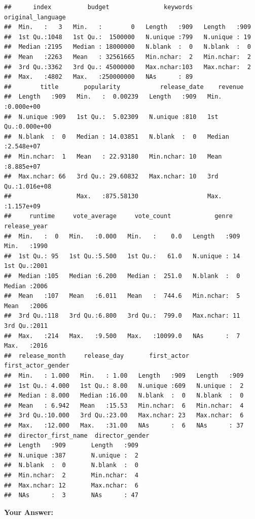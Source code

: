 \documentclass[
]{article}
\begin{document}
\begin{verbatim}
##      index          budget               keywords   original_language
##  Min.   :   3   Min.   :        0   Length   :909   Length   :909    
##  1st Qu.:1048   1st Qu.:  1500000   N.unique :799   N.unique : 19    
##  Median :2195   Median : 18000000   N.blank  :  0   N.blank  :  0    
##  Mean   :2263   Mean   : 32561665   Min.nchar:  2   Min.nchar:  2    
##  3rd Qu.:3362   3rd Qu.: 45000000   Max.nchar:103   Max.nchar:  2    
##  Max.   :4802   Max.   :250000000   NAs      : 89                    
##        title       popularity           release_date    revenue         
##  Length   :909   Min.   :  0.00239   Length   :909   Min.   :0.000e+00  
##  N.unique :909   1st Qu.:  5.02309   N.unique :810   1st Qu.:0.000e+00  
##  N.blank  :  0   Median : 14.03851   N.blank  :  0   Median :2.548e+07  
##  Min.nchar:  1   Mean   : 22.93180   Min.nchar: 10   Mean   :8.885e+07  
##  Max.nchar: 66   3rd Qu.: 29.60832   Max.nchar: 10   3rd Qu.:1.016e+08  
##                  Max.   :875.58130                   Max.   :1.157e+09  
##     runtime     vote_average     vote_count            genre      release_year 
##  Min.   :  0   Min.   :0.000   Min.   :    0.0   Length   :909   Min.   :1990  
##  1st Qu.: 95   1st Qu.:5.500   1st Qu.:   61.0   N.unique : 14   1st Qu.:2001  
##  Median :105   Median :6.200   Median :  251.0   N.blank  :  0   Median :2006  
##  Mean   :107   Mean   :6.011   Mean   :  744.6   Min.nchar:  5   Mean   :2006  
##  3rd Qu.:118   3rd Qu.:6.800   3rd Qu.:  799.0   Max.nchar: 11   3rd Qu.:2011  
##  Max.   :214   Max.   :9.500   Max.   :10099.0   NAs      :  7   Max.   :2016  
##  release_month     release_day       first_actor  first_actor_gender
##  Min.   : 1.000   Min.   : 1.00   Length   :909   Length   :909     
##  1st Qu.: 4.000   1st Qu.: 8.00   N.unique :609   N.unique :  2     
##  Median : 8.000   Median :16.00   N.blank  :  0   N.blank  :  0     
##  Mean   : 6.942   Mean   :15.53   Min.nchar:  6   Min.nchar:  4     
##  3rd Qu.:10.000   3rd Qu.:23.00   Max.nchar: 23   Max.nchar:  6     
##  Max.   :12.000   Max.   :31.00   NAs      :  6   NAs      : 37     
##  director_first_name  director_gender
##  Length   :909       Length   :909   
##  N.unique :387       N.unique :  2   
##  N.blank  :  0       N.blank  :  0   
##  Min.nchar:  2       Min.nchar:  4   
##  Max.nchar: 12       Max.nchar:  6   
##  NAs      :  3       NAs      : 47
\end{verbatim}

\textbf{Your Answer:}
\end{document}
